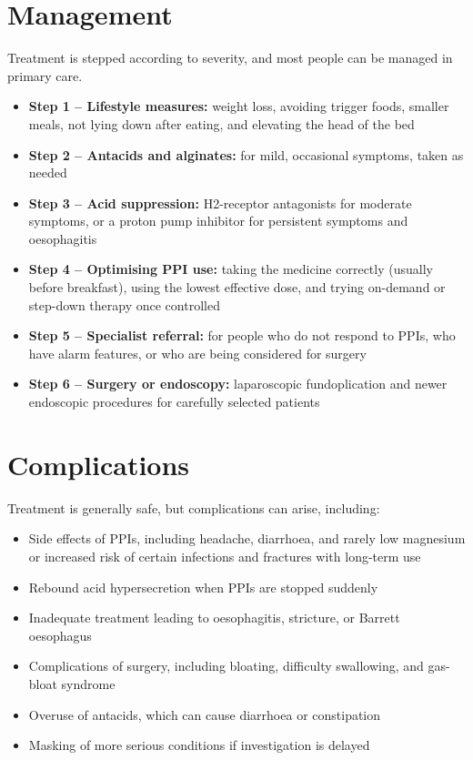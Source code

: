 \section*{Management}
Treatment is stepped according to severity, and most people can be managed in primary care.

\begin{itemize}
    \item \textbf{Step 1 -- Lifestyle measures:} weight loss, avoiding trigger foods, smaller meals, not lying down after eating, and elevating the head of the bed
    \item \textbf{Step 2 -- Antacids and alginates:} for mild, occasional symptoms, taken as needed
    \item \textbf{Step 3 -- Acid suppression:} H2-receptor antagonists for moderate symptoms, or a proton pump inhibitor for persistent symptoms and oesophagitis
    \item \textbf{Step 4 -- Optimising PPI use:} taking the medicine correctly (usually before breakfast), using the lowest effective dose, and trying on-demand or step-down therapy once controlled
    \item \textbf{Step 5 -- Specialist referral:} for people who do not respond to PPIs, who have alarm features, or who are being considered for surgery
    \item \textbf{Step 6 -- Surgery or endoscopy:} laparoscopic fundoplication and newer endoscopic procedures for carefully selected patients
\end{itemize}

\section*{Complications}
Treatment is generally safe, but complications can arise, including:

\begin{itemize}
    \item Side effects of PPIs, including headache, diarrhoea, and rarely low magnesium or increased risk of certain infections and fractures with long-term use
    \item Rebound acid hypersecretion when PPIs are stopped suddenly
    \item Inadequate treatment leading to oesophagitis, stricture, or Barrett oesophagus
    \item Complications of surgery, including bloating, difficulty swallowing, and gas-bloat syndrome
    \item Overuse of antacids, which can cause diarrhoea or constipation
    \item Masking of more serious conditions if investigation is delayed
\end{itemize}


